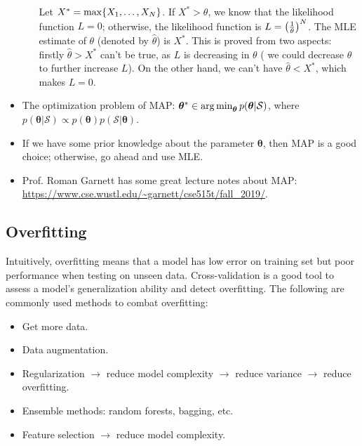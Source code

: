 \begin{itemize}
\begin{enumerate}
                Let $X^\ast = \max \{ X_1, \ldots, X_N \}$.
                If $X^\ast > \theta$, we know that the likelihood function $L = 0$; otherwise, the likelihood function is $L = \left( \frac{1}{\theta}\right)^N$.
                The MLE estimate of $\theta$ (denoted by $\hat{\theta}$) is $X^\ast$.
                This is proved from two aspects: firstly  $\hat{\theta} > X^\ast$ can't be true, as $L$ is decreasing in $\theta$ ( we could decrease $\theta$ to further increase $L$). 
                On the other hand, we can't have $\hat{\theta} < X^\ast$, which makes $L=0$. 
            \end{enumerate}
        \item The optimization problem of MAP: $\bm{\theta}^\ast \in  \operatorname{arg\,min}_{\bm{\theta}} p(\bm{\theta} | \mathcal{S})$, where $p(\bm{\theta} | \mathcal{S}) \propto p(\bm{\theta})p(\mathcal{S} | \bm{\theta})$.
        \item If we have some prior knowledge about the parameter $\bm{\theta}$, then MAP is a good choice; otherwise, go ahead and use MLE. 
        \item Prof. Roman Garnett has some great lecture notes about MAP: \url{https://www.cse.wustl.edu/~garnett/cse515t/fall_2019/}.
    \end{itemize}
        
    

\subsection{Overfitting}
    Intuitively, overfitting means that a model has low error on training set but poor performance when testing on unseen data.
    Cross-validation is a good tool to assess a model's generalization ability and detect overfitting.
    The following are commonly used methods to combat overfitting:
        \begin{itemize}
            \item Get more data.
            \item Data augmentation.
            \item Regularization $ \rightarrow $ reduce model complexity $ \rightarrow $ reduce variance $ \rightarrow $ reduce overfitting.
            \item Ensemble methods: random forests, bagging, etc.
            \item Feature selection $ \rightarrow $ reduce model complexity.
        \end{itemize}



